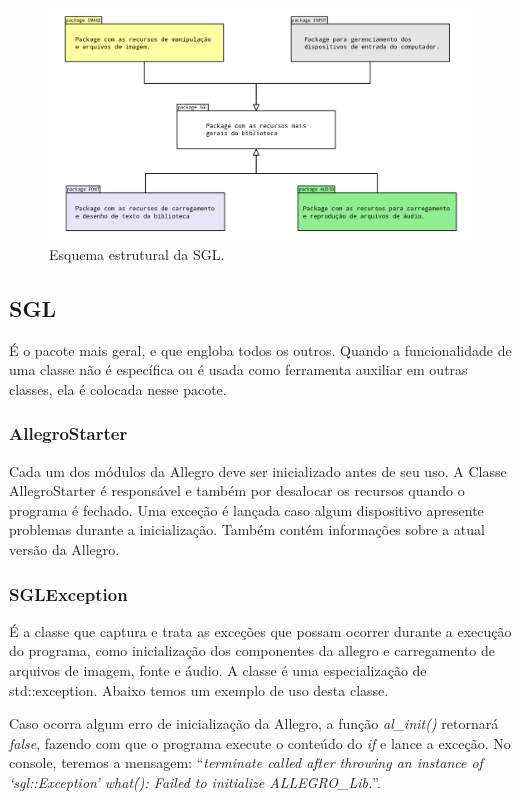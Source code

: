 \begin{figure}[H]
    \centering
    \includegraphics[scale = 0.2]{Imagens/pacotes.png}
    \caption{Esquema estrutural da SGL. }
    \label{pacotes}
\end{figure}
%
%
%
\subsection{SGL}
%
%
É o pacote mais geral, e que engloba todos os outros. Quando a funcionalidade de uma classe não é específica ou é usada como ferramenta auxiliar em outras classes, ela é colocada nesse pacote.
%
\subsubsection{AllegroStarter}
%
Cada um dos módulos da Allegro deve ser inicializado antes de seu uso. A Classe AllegroStarter é responsável e também por desalocar os recursos quando o programa é fechado. Uma exceção é lançada caso algum dispositivo apresente problemas durante a inicialização. Também contém informações sobre a atual versão da Allegro. 
%
%
\subsubsection{SGLException}
%
É a classe que captura e trata as exceções que possam ocorrer durante a execução do programa, como inicialização dos componentes da allegro e carregamento de arquivos de imagem, fonte e áudio. A classe é uma especialização de std::exception. Abaixo temos um exemplo de uso desta classe.
%

%
\par 
Caso ocorra algum erro de inicialização da Allegro, a função \textit{al\_init()} retornará \textit{false}, fazendo com que o programa execute o conteúdo do \textit{if} e lance a exceção. No console, teremos a mensagem:  ``\textit{terminate called after throwing an instance of `sgl::Exception'
what(): Failed to initialize ALLEGRO\_Lib.}''.
%
%
